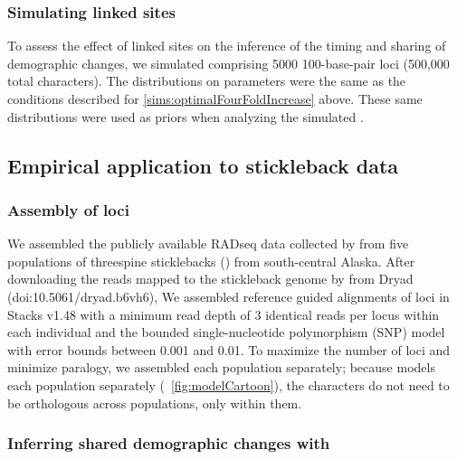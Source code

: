 \subsubsection{Simulating linked sites}
To assess the effect of linked sites on the inference
of the timing and sharing of demographic changes,
we simulated \datasets comprising 5000 100-base-pair
loci (500,000 total characters).
The distributions on parameters were the same
as the conditions described for \ref{sims:optimalFourFoldIncrease} above.
These same distributions were used as priors when
analyzing the simulated \datasets.



\subsection{Empirical application to stickleback data}


\subsubsection{Assembly of loci}
We assembled the publicly available RADseq data collected by
\citet{Hohenlohe2010}
from five populations of threespine sticklebacks ()
from south-central Alaska.
After downloading the reads mapped to the stickleback genome by
\citet{Hohenlohe2010}
from Dryad
(doi:10.5061/dryad.b6vh6),
We assembled reference guided alignments of loci in Stacks v1.48
\citet{Catchen2013} with a minimum read depth of 3 identical reads per locus
within each individual and the bounded single-nucleotide polymorphism (SNP)
model with error bounds between
0.001 and 0.01.
To maximize the number of loci and minimize paralogy, we assembled each
population separately;
because \ecoevolity models each population separately
(\fig{}~\ref{fig:modelCartoon}),
the characters do not need to be orthologous across populations, only within
them.

\subsubsection{Inferring shared demographic changes with \ecoevolity}

